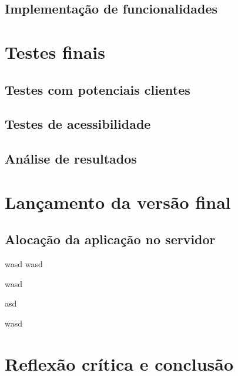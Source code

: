 \documentclass[11pt, twoside]{report}
\begin{document}
	\section{Implementação de funcionalidades}
	
	\chapter{Testes finais}
	\section{Testes com potenciais clientes}
	\section{Testes de acessibilidade}
	\section{Análise de resultados}
	
	\chapter{Lançamento da versão final}
	\section{Alocação da aplicação no servidor}
	
	\pagebreak
	wasd
	wasd
	
	
	wasd
	
	
	\pagebreak
	
	asd
	
	wasd
	\chapter{Reflexão crítica e conclusão}
	
	

	
	
	
\end{document}
